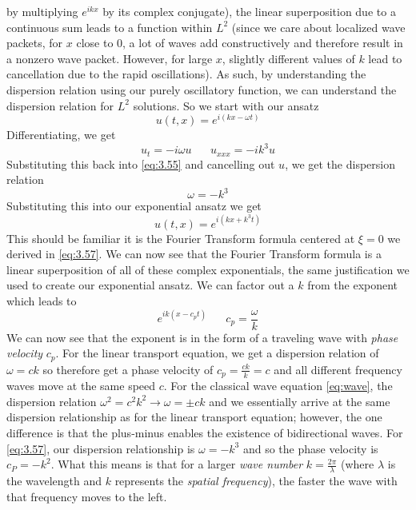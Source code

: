 \documentclass{article}
\numberwithin{equation}{section}
\begin{document}
by multiplying $e^{ikx}$ by its complex conjugate), the linear superposition due to a continuous sum leads to a function within $L^2$ (since we care about localized wave packets, for $x$ close to 0, a lot of waves add constructively and therefore result in a nonzero wave packet. However, for large $x$, slightly different values of $k$ lead to cancellation due to the rapid oscillations). As such, by understanding the dispersion relation using our purely oscillatory function, we can understand the dispersion relation for $L^2$ solutions. So we start with our ansatz
\begin{equation*}
    u(t,x) = e^{i(kx-\omega t)}
\end{equation*}
Differentiating, we get 
\begin{equation*}
    u_t = -i\omega u \hspace{20pt} u_{xxx} = -ik^3u
\end{equation*}
Substituting this back into \eqref{eq:3.55} and cancelling out $u$, we get the dispersion relation
\begin{equation}
    \omega = -k^3
\end{equation}
Substituting this into our exponential ansatz we get 
\begin{equation}
    u(t,x) = e^{i(kx+k^3t)} \label{eq:3.61}
\end{equation}
This should be familiar it is the Fourier Transform formula centered at $\xi=0$ we derived in \eqref{eq:3.57}. We can now see that the Fourier Transform formula is a linear superposition of all of these complex exponentials, the same justification we used to create our exponential ansatz. We can factor out a $k$ from the exponent which leads to 
\begin{equation}
    e^{ik(x-c_pt)} \hspace{20pt} c_p =\frac{\omega}{k}
\end{equation}
We can now see that the exponent is in the form of a traveling wave with \textit{phase velocity} $c_p$. For the linear transport equation, we get a dispersion relation of $\omega = ck$ so therefore get a phase velocity of $c_p = \frac{ck}{k} = c$ and all different frequency waves move at the same speed $c$. For the classical wave equation \eqref{eq:wave}, the dispersion relation $\omega ^2 = c^2k^2 \rightarrow \omega=\pm ck$ and we essentially arrive at the same dispersion relationship as for the linear transport equation; however, the one difference is that the plus-minus enables the existence of bidirectional waves. For \eqref{eq:3.57}, our dispersion relationship is $\omega = -k^3$ and so the phase velocity is $c_P = -k^2$. What this means is that for a larger \textit{wave number} $k=\frac{2\pi}{\lambda}$ (where $\lambda$ is the wavelength and $k$ represents the \textit{spatial frequency}), the faster the wave with that frequency moves to the left. \\\\
\end{document}
